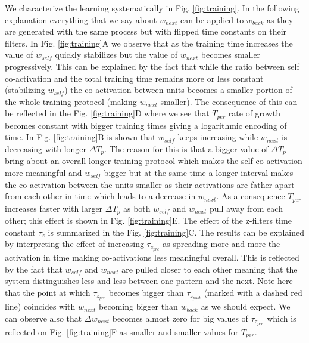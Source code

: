 \documentclass[10pt,a4paper]{article}
\begin{document}
We characterize the learning systematically in Fig. \ref{fig:training}.  In the following explanation everything that we say about $w_{next}$ can be applied to $w_{back}$ as they are generated with the same process but with flipped time constants on their filters. In Fig. \ref{fig:training}A we observe that as the training time increases the value of $w_{self}$ quickly stabilizes but the value of $w_{next}$ becomes smaller progressively. This can be explained by the fact that while the ratio between self co-activation and the total training time remains more or less constant (stabilizing $w_{self}$) the co-activation between units becomes a smaller portion of the whole training protocol (making $w_{next}$ smaller). The consequence of this can be reflected in the Fig. \ref{fig:training}D where we see that $T_{per}$ rate of growth becomes constant with bigger training times giving a logarithmic encoding of time. In Fig. \ref{fig:training}B is shown that $w_{self}$ keeps increasing while $w_{next}$ is decreasing with longer $\Delta T_p$. The reason for this is that a bigger value of $\Delta T_p$ bring about an overall longer training protocol which makes the self co-activation more meaningful and $w_{self}$ bigger but at the same time a longer interval makes the co-activation between the units smaller as their activations are father apart from each other in time which leads to a decrease in $w_{next}$. As a consequence $T_{per}$ increases faster with larger $\Delta T_p$ as both $w_{self}$ and $w_{next}$ pull away from each other; this effect is shown in Fig. \ref{fig:training}E. The effect of the z-filters time constant $\tau_z$ is summarized in the Fig. \ref{fig:training}C. The results can be explained by interpreting the effect of increasing $\tau_{z_{pre}}$ as spreading more and more the activation in time making co-activations less meaningful overall. This is reflected by the fact that $w_{self}$  and $w_{next}$ are pulled closer to each other meaning that the system distinguishes less and less between one pattern and the next. Note here that the point at which $\tau_{z_{pre}}$ becomes bigger than $\tau_{z_{post}}$ (marked with a dashed red line) coincides with $w_{next}$ becoming bigger than $w_{back}$ as we should expect. We can observe also that  $\Delta w_{next}$ becomes almost zero for big values of $\tau_{z_{pre}}$ which is reflected on Fig. \ref{fig:training}F as smaller and smaller values for $T_{per}$. 
\end{document}
